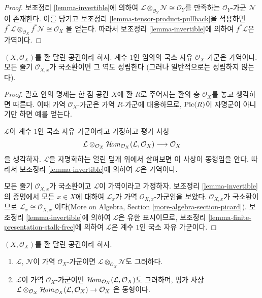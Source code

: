 \begin{proof}
보조정리 \ref{lemma-invertible}에 의하여
$\mathcal{L} \otimes_{\mathcal{O}_Y} \mathcal{N} \cong \mathcal{O}_Y$를
만족하는 $\mathcal{O}_Y$-가군 $\mathcal{N}$이 존재한다.
이를 당기고 보조정리 \ref{lemma-tensor-product-pullback}을 적용하면
$f^*\mathcal{L} \otimes_{\mathcal{O}_X} f^*\mathcal{N} \cong \mathcal{O}_X$
을 얻는다. 따라서 보조정리 \ref{lemma-invertible}에 의하여
$f^*\mathcal{L}$은 가역이다.
\end{proof}

\begin{lemma}
\label{lemma-invertible-is-locally-free-rank-1}
$(X, \mathcal{O}_X)$를 환 달린 공간이라 하자. 계수 $1$인 임의의
국소 자유 $\mathcal{O}_X$-가군은 가역이다.
모든 줄기 $\mathcal{O}_{X, x}$가 국소환이면 그 역도 성립한다
(그러나 일반적으로는 성립하지 않는다).
\end{lemma}

\begin{proof}
괄호 안의 명제는 한 점 공간 $X$에 환 $R$로 주어지는 환의 층
$\mathcal{O}_X$를 놓고 생각하면 따른다. 이때 가역
$\mathcal{O}_X$-가군은 가역 $R$-가군에 대응하므로,
$\mathop{\mathrm{Pic}}\nolimits(R)$이 자명군이 아니기만 하면 예를 얻는다.

\medskip\noindent
$\mathcal{L}$이 계수 $1$인 국소 자유 가군이라고 가정하고 평가 사상
$$
\mathcal{L} \otimes_{\mathcal{O}_X}
\mathop{\mathcal{H}\!\mathit{om}}\nolimits_{\mathcal{O}_X}(\mathcal{L}, \mathcal{O}_X)
\longrightarrow \mathcal{O}_X
$$
을 생각하자. $\mathcal{L}$을 자명화하는 열린 덮개 위에서 살펴보면
이 사상이 동형임을 안다. 따라서 보조정리 \ref{lemma-invertible}에
의하여 $\mathcal{L}$은 가역이다.

\medskip\noindent
모든 줄기 $\mathcal{O}_{X, x}$가 국소환이고 $\mathcal{L}$이
가역이라고 가정하자. 보조정리 \ref{lemma-invertible}의 증명에서
모든 $x \in X$에 대하여 $\mathcal{L}_x$가 가역
$\mathcal{O}_{X, x}$-가군임을 보았다. $\mathcal{O}_{X, x}$가
국소환이므로
$\mathcal{L}_x \cong \mathcal{O}_{X, x}$
이다(More on Algebra, Section \ref{more-algebra-section-picard}).
보조정리 \ref{lemma-invertible}에 의하여 $\mathcal{L}$은 유한 표시이므로,
보조정리 \ref{lemma-finite-presentation-stalk-free}에 의하여
$\mathcal{L}$은 계수 $1$인 국소 자유 가군이다.
\end{proof}

\begin{lemma}
\label{lemma-constructions-invertible}
$(X, \mathcal{O}_X)$를 환 달린 공간이라 하자.
\begin{enumerate}
\item $\mathcal{L}$, $\mathcal{N}$이 가역
$\mathcal{O}_X$-가군이면
$\mathcal{L} \otimes_{\mathcal{O}_X} \mathcal{N}$도 그러하다.
\item $\mathcal{L}$이 가역 $\mathcal{O}_X$-가군이면
$\mathop{\mathcal{H}\!\mathit{om}}\nolimits_{\mathcal{O}_X}(\mathcal{L}, \mathcal{O}_X)$도 그러하며, 평가 사상
$\mathcal{L} \otimes_{\mathcal{O}_X}
\mathop{\mathcal{H}\!\mathit{om}}\nolimits_{\mathcal{O}_X}(\mathcal{L}, \mathcal{O}_X) \to \mathcal{O}_X$
은 동형이다.
\end{enumerate}
\end{lemma}

